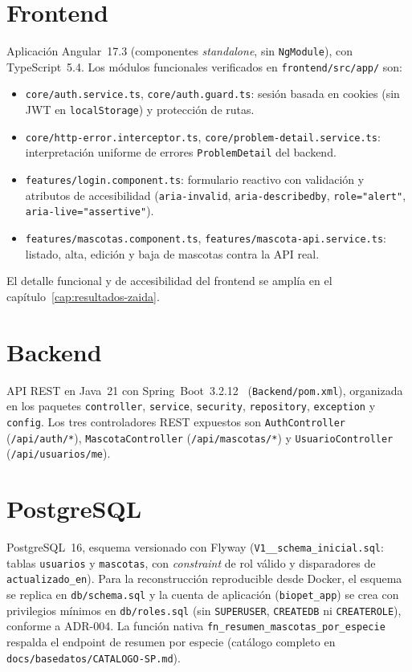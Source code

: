 \section{Frontend}
Aplicaci\'on Angular~17.3 (componentes \emph{standalone}, sin
\texttt{NgModule}), con TypeScript~5.4. Los m\'odulos funcionales
verificados en \texttt{frontend/src/app/} son:
\begin{itemize}[nosep]
  \item \texttt{core/auth.service.ts}, \texttt{core/auth.guard.ts}: sesi\'on
    basada en cookies (sin JWT en \texttt{localStorage}) y protecci\'on de
    rutas.
  \item \texttt{core/http-error.interceptor.ts},
    \texttt{core/problem-detail.service.ts}: interpretaci\'on uniforme de
    errores \texttt{ProblemDetail} del backend.
  \item \texttt{features/login.component.ts}: formulario reactivo con
    validaci\'on y atributos de accesibilidad (\texttt{aria-invalid},
    \texttt{aria-describedby}, \texttt{role="alert"},
    \texttt{aria-live="assertive"}).
  \item \texttt{features/mascotas.component.ts},
    \texttt{features/mascota-api.service.ts}: listado, alta, edici\'on y
    baja de mascotas contra la API real.
\end{itemize}
El detalle funcional y de accesibilidad del frontend se ampl\'ia en el
cap\'itulo~\ref{cap:resultados-zaida}.

\section{Backend}
API REST en Java~21 con Spring~Boot~3.2.12~\cite{spring-boot-docs} (\texttt{Backend/pom.xml}),
organizada en los paquetes \texttt{controller}, \texttt{service},
\texttt{security}, \texttt{repository}, \texttt{exception} y
\texttt{config}. Los tres controladores REST expuestos son
\texttt{AuthController} (\texttt{/api/auth/*}), \texttt{MascotaController}
(\texttt{/api/mascotas/*}) y \texttt{UsuarioController}
(\texttt{/api/usuarios/me}).

\section{PostgreSQL}
PostgreSQL~16, esquema versionado con Flyway
(\texttt{V1__schema_inicial.sql}: tablas \texttt{usuarios} y
\texttt{mascotas}, con \emph{constraint} de rol v\'alido y disparadores de
\texttt{actualizado_en}). Para la reconstrucci\'on reproducible desde
Docker, el esquema se replica en \texttt{db/schema.sql} y la cuenta de
aplicaci\'on (\texttt{biopet_app}) se crea con privilegios m\'inimos en
\texttt{db/roles.sql} (sin \texttt{SUPERUSER}, \texttt{CREATEDB} ni
\texttt{CREATEROLE}), conforme a ADR-004. La funci\'on nativa
\texttt{fn_resumen_mascotas_por_especie} respalda el endpoint de resumen
por especie (cat\'alogo completo en
\texttt{docs/basedatos/CATALOGO-SP.md}).

